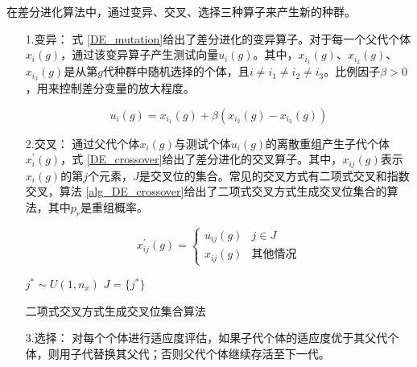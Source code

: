 在差分进化算法中，通过变异、交叉、选择三种算子来产生新的种群。
\begin{enumerate}

\item[1.变异：]式 \ref{DE_mutation}给出了差分进化的变异算子。对于每一个父代个体\(x_{i}(g)\)，通过该变异算子产生测试向量\(u_{i}(g)\)。其中，\(x_{i_{1}}(g)\)、\(x_{i_{2}}(g)\)、\(x_{i_{3}}(g)\)是从第\(g\)代种群中随机选择的个体，且\(i \neq i_{1} \neq i_{2} \neq i_{3}\)。比例因子\(\beta > 0\)，用来控制差分变量的放大程度。

\begin{equation}
\label{DE_mutation}
u_{i}(g) = x_{i_{1}}(g)+\beta(x_{i_{2}}(g)-x_{i_{3}}(g))
\end{equation}

\item[2.交叉：]通过父代个体\(x_{i}(g)\)与测试个体\(u_{i}(g)\)的离散重组产生子代个体\(x^{'}_{i}(g)\)，式 \ref{DE_crossover}给出了差分进化的交叉算子。其中，\(x_{ij}(g)\)表示\(x_{i}(g)\)的第\(j\)个元素，\(J\)是交叉位的集合。常见的交叉方式有二项式交叉和指数交叉，算法 \ref{alg_DE_crossover}给出了二项式交叉方式生成交叉位集合的算法，其中\(p_{r}\)是重组概率。


\begin{equation}
\label{DE_crossover}
x^{'}_{ij}(g)=
\begin{cases}
u_{ij}(g)& j \in J \\
x_{ij}(g)& \text{其他情况}
\end{cases}
\end{equation}


\IncMargin{1em}
\begin{algorithm}
\emph{$j^{*}\sim U \left( 1,n_{x} \right)$}\;
\emph{$J = \{j^{*}\}$}\;
\caption{二项式交叉方式生成交叉位集合算法}\label{alg_DE_crossover}
\end{algorithm}\DecMargin{1em}

\item[3.选择：]对每个个体进行适应度评估，如果子代个体的适应度优于其父代个体，则用子代替换其父代；否则父代个体继续存活至下一代。

\end{enumerate}


